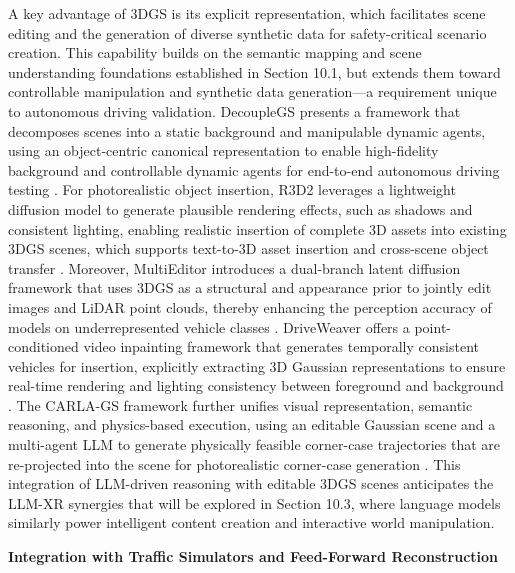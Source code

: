 \documentclass[11pt]{article}
\begin{document}
A key advantage of 3DGS is its explicit representation, which facilitates scene editing and the generation of diverse synthetic data for safety-critical scenario creation. This capability builds on the semantic mapping and scene understanding foundations established in Section 10.1, but extends them toward controllable manipulation and synthetic data generation---a requirement unique to autonomous driving validation. DecoupleGS presents a framework that decomposes scenes into a static background and manipulable dynamic agents, using an object-centric canonical representation to enable high-fidelity background and controllable dynamic agents for end-to-end autonomous driving testing \cite{ref666}. For photorealistic object insertion, R3D2 leverages a lightweight diffusion model to generate plausible rendering effects, such as shadows and consistent lighting, enabling realistic insertion of complete 3D assets into existing 3DGS scenes, which supports text-to-3D asset insertion and cross-scene object transfer \cite{ref667}. Moreover, MultiEditor introduces a dual-branch latent diffusion framework that uses 3DGS as a structural and appearance prior to jointly edit images and LiDAR point clouds, thereby enhancing the perception accuracy of models on underrepresented vehicle classes \cite{ref668}. DriveWeaver offers a point-conditioned video inpainting framework that generates temporally consistent vehicles for insertion, explicitly extracting 3D Gaussian representations to ensure real-time rendering and lighting consistency between foreground and background \cite{ref669}. The CARLA-GS framework further unifies visual representation, semantic reasoning, and physics-based execution, using an editable Gaussian scene and a multi-agent LLM to generate physically feasible corner-case trajectories that are re-projected into the scene for photorealistic corner-case generation \cite{ref670}. This integration of LLM-driven reasoning with editable 3DGS scenes anticipates the LLM-XR synergies that will be explored in Section 10.3, where language models similarly power intelligent content creation and interactive world manipulation.

\textbf{Integration with Traffic Simulators and Feed-Forward Reconstruction}
\end{document}
